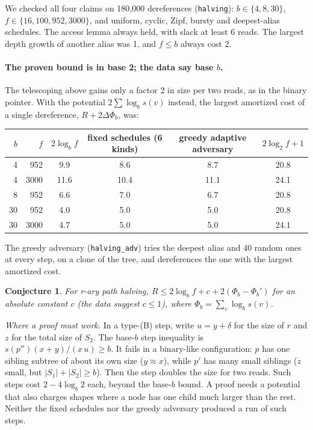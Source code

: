 \documentclass[11pt]{article}
\newtheorem{conjecture}[theorem]{Conjecture}
\theoremstyle{definition}
\begin{document}
We checked all four claims on 180{,}000 dereferences (\texttt{halving}): $b\in\{4,8,30\}$,
$f\in\{16,100,952,3000\}$, and uniform, cyclic, Zipf, bursty and
deepest-alias schedules. The access lemma always held, with slack at least
6 reads. The largest depth growth of another alias was 1, and $f\le b$ always
cost 2.

\paragraph{The proven bound is in base 2; the data say base $b$.} The telescoping
above gains only a factor 2 in size per two reads, as in the binary pointer.
With the potential $2\sum\log_b s(v)$ instead, the largest amortized cost of a
single dereference, $R+2\Delta\Phi_b$, was:

\begin{center}\small
\begin{tabular}{rr|c|cc|c}
$b$&$f$&$2\log_b f$&fixed schedules (6 kinds)&greedy adaptive adversary&$2\log_2f+1$\\\hline
4&952&9.9&8.6&8.7&20.8\\
4&3000&11.6&10.4&11.1&24.1\\
8&952&6.6&7.0&6.7&20.8\\
30&952&4.0&5.0&5.0&20.8\\
30&3000&4.7&5.0&5.0&24.1
\end{tabular}
\end{center}
The greedy adversary (\texttt{halving\_adv}) tries the deepest alias and 40
random ones at every step, on a clone of the tree, and dereferences the one
with the largest amortized cost.

\begin{conjecture}\label{conj:halving}
For r-ary path halving, $R\le 2\log_b f+c+2(\Phi_b-\Phi_b')$ for an absolute
constant $c$ (the data suggest $c\le1$), where $\Phi_b=\sum_v\log_b s(v)$.
\end{conjecture}

\emph{Where a proof must work.} In a type-(B) step, write $u=y+\delta$ for
the size of $r$ and $z$ for the total size of $S_2$. The base-$b$ step
inequality is $s(p'')(x+y)/(x\,u)\ge b$. It fails in a binary-like
configuration: $p$ has one sibling subtree of about its own size ($y\approx
x$), while $p'$ has many small siblings ($z$ small, but $|S_1|+|S_2|\ge b$).
Then the step doubles the size for two reads. Such steps cost
$2-4\log_b2$ each, beyond the base-$b$ bound. A proof needs a potential that
also charges shapes where a node has one child much larger than the rest.
Neither the fixed schedules nor the greedy adversary produced a run of such
steps.
\end{document}
